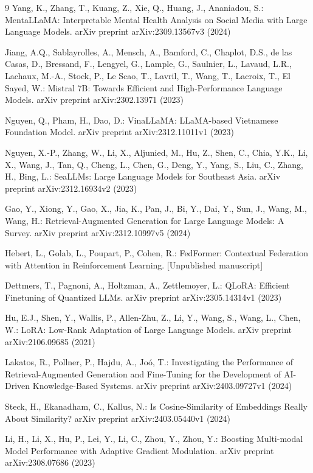 \documentclass[runningheads]{llncs}
\begin{document}
\begin{thebibliography}{9}
 Yang, K., Zhang, T., Kuang, Z., Xie, Q., Huang, J., Ananiadou, S.: MentaLLaMA: Interpretable Mental Health Analysis on Social Media with Large Language Models. arXiv preprint arXiv:2309.13567v3 (2024)

 Jiang, A.Q., Sablayrolles, A., Mensch, A., Bamford, C., Chaplot, D.S., de las Casas, D., Bressand, F., Lengyel, G., Lample, G., Saulnier, L., Lavaud, L.R., Lachaux, M.-A., Stock, P., Le Scao, T., Lavril, T., Wang, T., Lacroix, T., El Sayed, W.: Mistral 7B: Towards Efficient and High-Performance Language Models. arXiv preprint arXiv:2302.13971 (2023)

 Nguyen, Q., Pham, H., Dao, D.: VinaLLaMA: LLaMA-based Vietnamese Foundation Model. arXiv preprint arXiv:2312.11011v1 (2023)

 Nguyen, X.-P., Zhang, W., Li, X., Aljunied, M., Hu, Z., Shen, C., Chia, Y.K., Li, X., Wang, J., Tan, Q., Cheng, L., Chen, G., Deng, Y., Yang, S., Liu, C., Zhang, H., Bing, L.: SeaLLMs: Large Language Models for Southeast Asia. arXiv preprint arXiv:2312.16934v2 (2023)

 Gao, Y., Xiong, Y., Gao, X., Jia, K., Pan, J., Bi, Y., Dai, Y., Sun, J., Wang, M., Wang, H.: Retrieval-Augmented Generation for Large Language Models: A Survey. arXiv preprint arXiv:2312.10997v5 (2024)

 Hebert, L., Golab, L., Poupart, P., Cohen, R.: FedFormer: Contextual Federation with Attention in Reinforcement Learning. [Unpublished manuscript]

 Dettmers, T., Pagnoni, A., Holtzman, A., Zettlemoyer, L.: QLoRA: Efficient Finetuning of Quantized LLMs. arXiv preprint arXiv:2305.14314v1 (2023)

 Hu, E.J., Shen, Y., Wallis, P., Allen-Zhu, Z., Li, Y., Wang, S., Wang, L., Chen, W.: LoRA: Low-Rank Adaptation of Large Language Models. arXiv preprint arXiv:2106.09685 (2021)

 Lakatos, R., Pollner, P., Hajdu, A., Joó, T.: Investigating the Performance of Retrieval-Augmented Generation and Fine-Tuning for the Development of AI-Driven Knowledge-Based Systems. arXiv preprint arXiv:2403.09727v1 (2024)

 Steck, H., Ekanadham, C., Kallus, N.: Is Cosine-Similarity of Embeddings Really About Similarity? arXiv preprint arXiv:2403.05440v1 (2024)

 Li, H., Li, X., Hu, P., Lei, Y., Li, C., Zhou, Y., Zhou, Y.: Boosting Multi-modal Model Performance with Adaptive Gradient Modulation. arXiv preprint arXiv:2308.07686 (2023)


\end{thebibliography}
\end{document}
